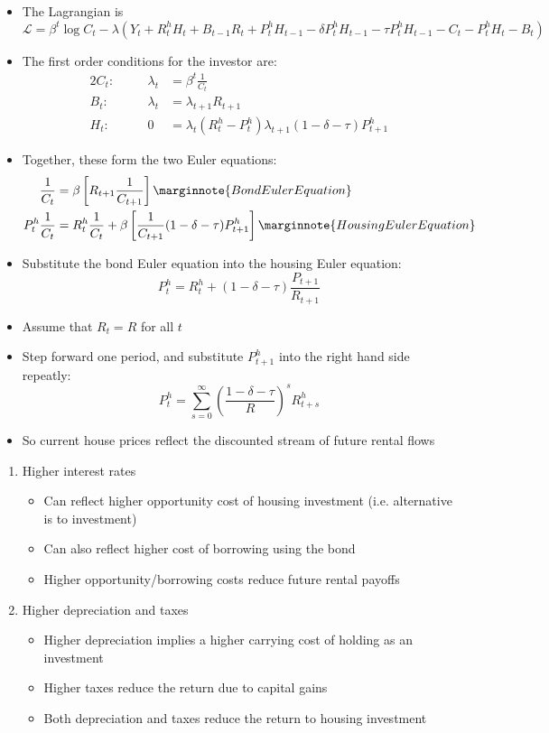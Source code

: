 \documentclass[a4paper]{article}
\begin{document}
\begin{itemize}
		\item The Lagrangian is
		\[
			\mathcal{L} = \beta^t\log C_t - \lambda(Y_t + R_t^h H_t + B_{t-1}R_t + P_t^h H_{t-1} - \delta P_t^h H_{t-1} - \tau P_t^h H_{t-1}- C_t - P_t^hH_t - B_t)
		\]
		\item The first order conditions for the investor are:
		\begin{alignat*}{2}
			C_t:\quad && \lambda_t&= \beta^t\frac{1}{C_t}\\
			B_t:\quad && \lambda_t&= \lambda_{t+1}R_{t+1}\\
			H_t:\quad && 0&= \lambda_t(R_t^h-P_t^h)\lambda_{t+1}(1-\delta-\tau)P_{t+1}^h
		\end{alignat*}
		\item Together, these form the two Euler equations:
		\begin{align*}{2}
			\frac{1}{C_t} &= \beta\left[R_{t+1} \frac{1}{C_{t+1}} \right] \marginnote{Bond Euler Equation}\\
			P_t^h \frac{1}{C_t} &= R^h_t\frac{1}{C_t} + \beta\left[ \frac{1}{C_{t+1}} (1-\delta-\tau)P_{t+1}^h \right] \marginnote{Housing Euler Equation}
		\end{align*}
		\item Substitute the bond Euler equation into the housing Euler equation:
		\[
			P_t^h = R_t^h + (1-\delta-\tau)\frac{P_{t+1}}{R_{t+1}}
		\]
		\item Assume that \( R_t = R \) for all \( t \)
		\item Step forward one period, and substitute \( P_{t+1}^h \) into the right hand side repeatly:
		\[
			P_t^h = \sum_{s=0}^\infty \left( \frac{1-\delta-\tau}{R}\right)^s R_{t+s}^h
		\]
		\item So current house prices reflect the discounted stream of future rental flows
	\end{itemize}
	\begin{enumerate}[label=\textbf{\arabic*.}]
		\item Higher interest rates
		\begin{itemize}
			\item Can reflect higher opportunity cost of housing investment (i.e. alternative is to investment)
			\item Can also reflect higher cost of borrowing using the bond
			\item Higher opportunity/borrowing costs reduce future rental payoffs
		\end{itemize}
		\item Higher depreciation and taxes
		\begin{itemize}
			\item Higher depreciation implies a higher carrying cost of holding as an investment
			\item Higher taxes reduce the return due to capital gains
			\item Both depreciation and taxes reduce the return to housing investment
		\end{itemize}
	\end{enumerate}
\end{document}
